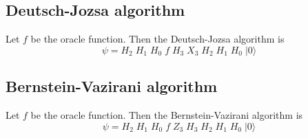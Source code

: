 \documentclass[12pt]{article}
\begin{document}
\subsection*{Deutsch-Jozsa algorithm}
Let $f$ be the oracle function.
Then the Deutsch-Jozsa algorithm is
\begin{equation*}
\psi = H_2 \; H_1 \; H_0 \; f \; H_3 \; X_3 \; H_2 \; H_1 \; H_0 \; |0\rangle
\end{equation*}

\subsection*{Bernstein-Vazirani algorithm}
Let $f$ be the oracle function.
Then the Bernstein-Vazirani algorithm is
\begin{equation*}
\psi = H_2 \; H_1 \; H_0 \; f \; Z_3 \; H_3 \; H_2 \; H_1 \; H_0 \; |0\rangle
\end{equation*}
\end{document}
